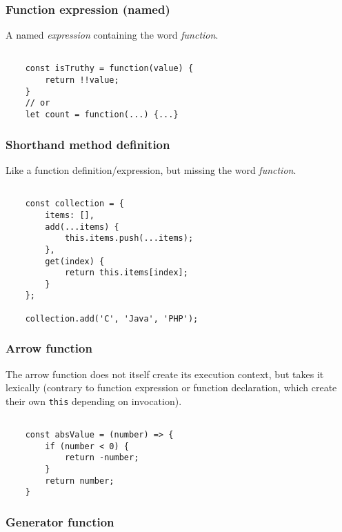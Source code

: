 \documentclass{scrartcl}
\begin{document}
\subsubsection{Function expression (named)}

A named \textit{expression} containing the word \textit{function}.

\begin{lstlisting}[style=ES6]

    const isTruthy = function(value) {
        return !!value;
    }
    // or
    let count = function(...) {...}

\end{lstlisting}

\subsubsection{Shorthand method definition}

Like a function definition/expression, but missing the word \textit{function}.

\begin{lstlisting}[style=ES6]

    const collection = {
        items: [],
        add(...items) {
            this.items.push(...items);
        },
        get(index) {
            return this.items[index];
        }
    };

    collection.add('C', 'Java', 'PHP');

\end{lstlisting}

\subsubsection{Arrow function}

The arrow function does not itself create its execution context, but takes it lexically (contrary to function expression or function declaration, which create their own \lstinline|this| depending on invocation).

\begin{lstlisting}[style=ES6]

    const absValue = (number) => {
        if (number < 0) {
            return -number;
        }
        return number;
    }

\end{lstlisting}

\subsubsection{Generator function}
\end{document}
